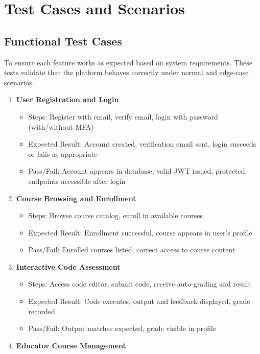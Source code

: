 \documentclass[a4paper,11pt]{scrartcl}
\begin{document}
\section{Test Cases and Scenarios}

\subsection{Functional Test Cases}
To ensure each feature works as expected based on system requirements. These tests validate that the platform behaves correctly under normal and edge-case scenarios.
\begin{enumerate}[leftmargin=*]
    \item \textbf{User Registration and Login}
        \begin{itemize}
            \item Steps: Register with email, verify email, login with password (with/without MFA)
            \item Expected Result: Account created, verification email sent, login succeeds or fails as appropriate
            \item Pass/Fail: Account appears in database, valid JWT issued, protected endpoints accessible after login
        \end{itemize}
    \item \textbf{Course Browsing and Enrollment}
        \begin{itemize}
            \item Steps: Browse course catalog, enroll in available courses
            \item Expected Result: Enrollment successful, course appears in user’s profile
            \item Pass/Fail: Enrolled courses listed, correct access to course content
        \end{itemize}
    \item \textbf{Interactive Code Assessment}
        \begin{itemize}
            \item Steps: Access code editor, submit code, receive auto-grading and result
            \item Expected Result: Code executes, output and feedback displayed, grade recorded
            \item Pass/Fail: Output matches expected, grade visible in profile
        \end{itemize}
    \item \textbf{Educator Course Management}

\end{enumerate}
\end{document}
